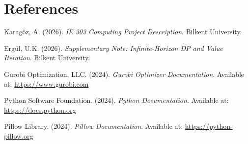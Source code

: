 \documentclass[11pt,a4paper]{article}
\begin{document}
\section*{References}

\begin{enumerate}[label={[}\arabic*{]}]
    \item Karagöz, A. (2026). \textit{IE 303 Computing Project Description}. Bilkent University.
    \item Ergül, U.K. (2026). \textit{Supplementary Note: Infinite-Horizon DP and Value Iteration}. Bilkent University.
    \item Gurobi Optimization, LLC. (2024). \textit{Gurobi Optimizer Documentation}. Available at: \url{https://www.gurobi.com}
    \item Python Software Foundation. (2024). \textit{Python Documentation}. Available at: \url{https://docs.python.org}
    \item Pillow Library. (2024). \textit{Pillow Documentation}. Available at: \url{https://python-pillow.org}
\end{enumerate}
\end{document}
